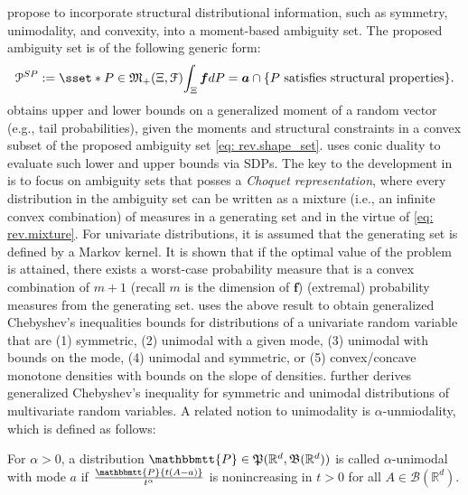 \documentclass[final,onefignum,onetabnum]{class}
\newcommand{\ee}[2]{\mathbb{E}_{#1} \left[ #2 \right]}
\newcommand{\bs}[1]{\boldsymbol{#1}} %
\newcommand{\Bs}[1]{\mathbb{#1}} %
\newcommand{\Ts}[1]{\mathbbmtt{#1}} %
\newcommand{\Cs}[1]{\mathcal{#1}} %
\newcommand{\Fs}[1]{\mathfrak{#1}} %
\newcommand{\txi}{\tilde{\bs{\xi}}}
\newcommand{\M}{\Fs{M}_{+}(\Xi,\Cs{F})}
\renewcommand{\P}{\Fs{P}(\Bs{R}^{d},\Fs{B}(\Bs{R}^{d}))}
\begin{document}
\citet{popescu2005semidefinite} propose to incorporate structural distributional information, such as symmetry, unimodality, and convexity, into a moment-based ambiguity set.
The proposed ambiguity set is of the following generic form:
\begin{equation}
\label{eq: rev.shape_set}
\Cs{P}^{SP}:=\sset*{P \in\M}{ \int_{\Xi} \bs{f} d P = \bs{a} } \cap \{P  \ \text{satisfies structural properties}\}.
\end{equation}
\citet{popescu2005semidefinite} obtains upper and lower bounds on a generalized moment of a random vector (e.g., tail probabilities), given the moments and structural constraints in a convex subset of the proposed  ambiguity set \eqref{eq: rev.shape_set}. 
\citet{popescu2005semidefinite} uses conic duality to evaluate such  lower and upper bounds via   SDPs. The key to the development in 
\citet{popescu2005semidefinite} is to focus on  ambiguity sets that posses a {\it Choquet representation}, where every distribution in the ambiguity set can be written as a mixture (i.e., an infinite convex combination) of measures in a generating set and in the virtue of \eqref{eq: rev.mixture}. For univariate distributions, it is assumed that the generating set is defined by a Markov kernel.  %
It is  shown that if the optimal value of the problem is attained, there exists a worst-case probability measure that is a convex combination of $m+1$ (recall $m$ is the dimension of $\bs{f}$) (extremal) probability measures from the generating set. 
\citet{popescu2005semidefinite} uses the above result to obtain generalized Chebyshev's inequalities bounds for distributions of a univariate random variable that are (1) symmetric, (2) unimodal
with a given mode, (3) unimodal with bounds on the mode, (4) unimodal and symmetric, or (5) convex/concave monotone  densities with bounds on the slope of densities. 
\citet{popescu2005semidefinite} further derives generalized Chebyshev's inequality for symmetric and unimodal
distributions of multivariate random variables. 
A related notion to unimodality is $\alpha$-unmiodality, which is defined as follows:
\begin{definition}{\citet{dharmadhikari1988unimodality}}
\label{def: rev.alpha_model}
For $\alpha>0$, a distribution $\Ts{P} \in \P$ is called $\alpha$-unimodal with mode $a$ if $\frac{\Ts{P}\{t (A-a)\}}{t^{\alpha}}$ is nonincreasing in $t>0$ for all $A \in \Cs{B}(\Bs{R}^{d})$.
\end{definition}
\end{document}
